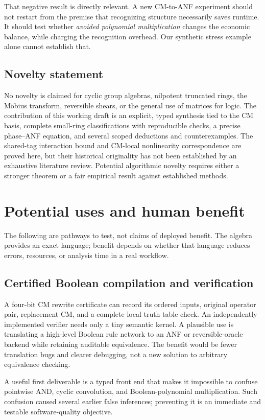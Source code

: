 That negative result is directly relevant. A new CM-to-ANF experiment should not restart from the premise that recognizing structure necessarily saves runtime. It should test whether \emph{avoided polynomial multiplication} changes the economic balance, while charging the recognition overhead. Our synthetic stress example alone cannot establish that.

\subsection{Novelty statement}
No novelty is claimed for cyclic group algebras, nilpotent truncated rings, the M\"obius transform, reversible shears, or the general use of matrices for logic. The contribution of this working draft is an explicit, typed synthesis tied to the CM basis, complete small-ring classifications with reproducible checks, a precise phase--ANF equation, and several scoped deductions and counterexamples. The shared-tag interaction bound and CM-local nonlinearity correspondence are proved here, but their historical originality has not been established by an exhaustive literature review. Potential algorithmic novelty requires either a stronger theorem or a fair empirical result against established methods.

\section{Potential uses and human benefit}\label{sec:uses}
The following are pathways to test, not claims of deployed benefit. The algebra provides an exact language; benefit depends on whether that language reduces errors, resources, or analysis time in a real workflow.

\subsection{Certified Boolean compilation and verification}
A four-bit CM rewrite certificate can record its ordered inputs, original operator pair, replacement CM, and a complete local truth-table check. An independently implemented verifier needs only a tiny semantic kernel. A plausible use is translating a high-level Boolean rule network to an ANF or reversible-oracle backend while retaining auditable equivalence. The benefit would be fewer translation bugs and clearer debugging, not a new solution to arbitrary equivalence checking.

A useful first deliverable is a typed front end that makes it impossible to confuse pointwise AND, cyclic convolution, and Boolean-polynomial multiplication. Such confusion caused several earlier false inferences; preventing it is an immediate and testable software-quality objective.

